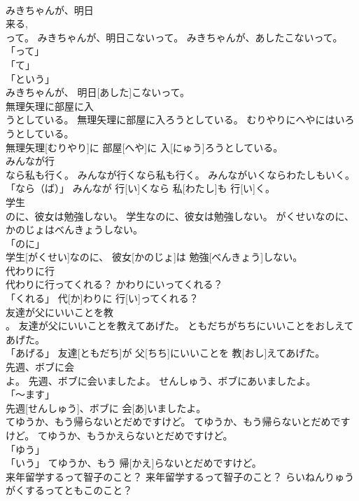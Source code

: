 \documentclass[8pt]{extreport}
\begin{document}
\begin{CJK}{UTF8}{min}
\\	みきちゃんが、明日
\\	来る, 
\\	って。	みきちゃんが、明日こないって。	みきちゃんが、あしたこないって。	
\\	「って」 
\\	「て」 
\\	「という」 
\\	みきちゃんが、 明日[あした]こないって。		
\\	無理矢理に部屋に入
\\	うとしている。	無理矢理に部屋に入ろうとしている。	むりやりにへやにはいろうとしている。	
\\	無理矢理[むりやり]に 部屋[へや]に 入[にゅう]ろうとしている。		
\\	みんなが行
\\	なら私も行く。	みんなが行くなら私も行く。	みんながいくならわたしもいく。	
\\	「なら（ば）」	みんなが 行[い]くなら 私[わたし]も 行[い]く。		
\\	学生
\\	のに、彼女は勉強しない。	学生なのに、彼女は勉強しない。	がくせいなのに、かのじょはべんきょうしない。	
\\	「のに」 
\\	学生[がくせい]なのに、 彼女[かのじょ]は 勉強[べんきょう]しない。		
\\	代わりに行
\\	代わりに行ってくれる？	かわりにいってくれる？	
\\	「くれる」	代[か]わりに 行[い]ってくれる？		
\\	友達が父にいいことを教
\\	。	友達が父にいいことを教えてあげた。	ともだちがちちにいいことをおしえてあげた。	
\\	「あげる」	友達[ともだち]が 父[ちち]にいいことを 教[おし]えてあげた。		
\\	先週、ボブに会
\\	よ。	先週、ボブに会いましたよ。	せんしゅう、ボブにあいましたよ。	
\\	「～ます」 
\\	先週[せんしゅう]、ボブに 会[あ]いましたよ。		
\\	てゆうか、もう帰らないとだめですけど。	てゆうか、もう帰らないとだめですけど。	てゆうか、もうかえらないとだめですけど。	
\\	「ゆう」 
\\	「いう」	てゆうか、もう 帰[かえ]らないとだめですけど。		
\\	来年留学するって智子のこと？	来年留学するって智子のこと？	らいねんりゅうがくするってともこのこと？	

\end{CJK}
\end{document}
